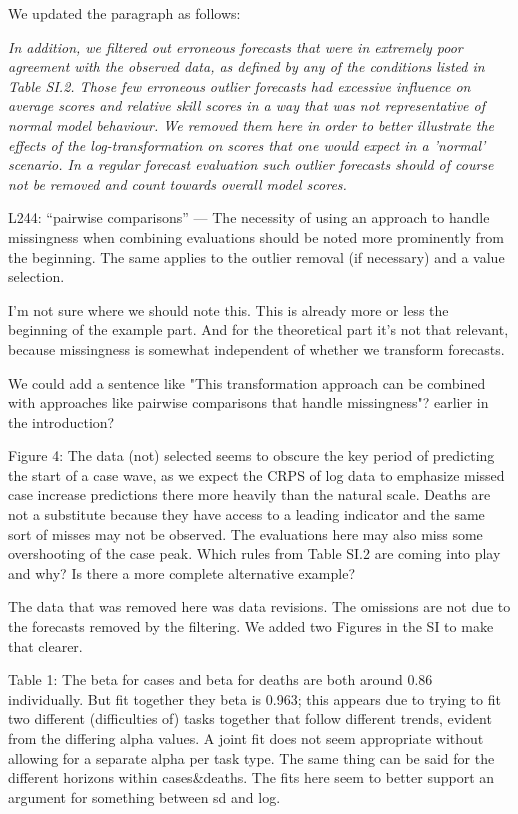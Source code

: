 \documentclass{article}
\newcommand{\red}{\color{red}}
\newcommand{\black}{\color{black}}
\begin{document}
\black
We updated the paragraph as follows: 

\textit{In addition, we filtered out erroneous forecasts that were in extremely poor agreement with the observed data, as defined by any of the conditions listed in Table SI.2. Those few erroneous outlier forecasts had excessive influence on average scores and relative skill scores in a way that was not representative of normal model behaviour. We removed them here in order to better illustrate the effects of the log-transformation on scores that one would expect in a 'normal' scenario. In a regular forecast evaluation such outlier forecasts should of course not be removed and count towards overall model scores.} 

L244: “pairwise comparisons” — The necessity of using an approach to handle missingness when combining evaluations should be noted more prominently from the beginning. The same applies to the outlier removal (if necessary) and a value selection.

\black
I'm not sure where we should note this. This is already more or less the beginning of the example part. 
And for the theoretical part it's not that relevant, because missingness is somewhat independent of whether we transform forecasts. 

We could add a sentence like "This transformation approach can be combined with approaches like pairwise comparisons that handle missingness"? earlier in the introduction? 


\red
Figure 4: The data (not) selected seems to obscure the key period of predicting the start of a case wave, as we expect the CRPS of log data to emphasize missed case increase predictions there more heavily than the natural scale. Deaths are not a substitute because they have access to a leading indicator and the same sort of misses may not be observed. The evaluations here may also miss some overshooting of the case peak. Which rules from Table SI.2 are coming into play and why? Is there a more complete alternative example?

\black
The data that was removed here was data revisions. The omissions are not due to the forecasts removed by the filtering. We added two Figures in the SI to make that clearer. 

\red
Table 1: The beta for cases and beta for deaths are both around 0.86 individually. But fit together they beta is 0.963; this appears due to trying to fit two different (difficulties of) tasks together that follow different trends, evident from the differing alpha values. A joint fit does not seem appropriate without allowing for a separate alpha per task type. The same thing can be said for the different horizons within cases\&deaths. The fits here seem to better support an argument for something between sd and log.
\end{document}
